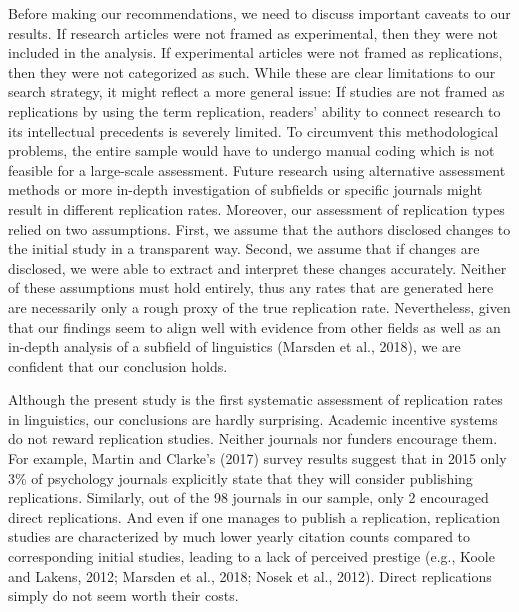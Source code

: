 \documentclass[]{elsarticle} %
\begin{document}
Before making our recommendations, we need to discuss important caveats to our results. If research articles were not framed as experimental, then they were not included in the analysis. If experimental articles were not framed as replications, then they were not categorized as such. While these are clear limitations to our search strategy, it might reflect a more general issue: If studies are not framed as replications by using the term replication, readers' ability to connect research to its intellectual precedents is severely limited. To circumvent this methodological problems, the entire sample would have to undergo manual coding which is not feasible for a large-scale assessment. Future research using alternative assessment methods or more in-depth investigation of subfields or specific journals might result in different replication rates.
Moreover, our assessment of replication types relied on two assumptions. First, we assume that the authors disclosed changes to the initial study in a transparent way. Second, we assume that if changes are disclosed, we were able to extract and interpret these changes accurately. Neither of these assumptions must hold entirely, thus any rates that are generated here are necessarily only a rough proxy of the true replication rate. Nevertheless, given that our findings seem to align well with evidence from other fields as well as an in-depth analysis of a subfield of linguistics (Marsden et al., 2018), we are confident that our conclusion holds.

Although the present study is the first systematic assessment of replication rates in linguistics, our conclusions are hardly surprising. Academic incentive systems do not reward replication studies. Neither journals nor funders encourage them. For example, Martin and Clarke's (2017) survey results suggest that in 2015 only 3\% of psychology journals explicitly state that they will consider publishing replications. Similarly, out of the 98 journals in our sample, only 2 encouraged direct replications. And even if one manages to publish a replication, replication studies are characterized by much lower yearly citation counts compared to corresponding initial studies, leading to a lack of perceived prestige (e.g., Koole and Lakens, 2012; Marsden et al., 2018; Nosek et al., 2012). Direct replications simply do not seem worth their costs.
\end{document}
